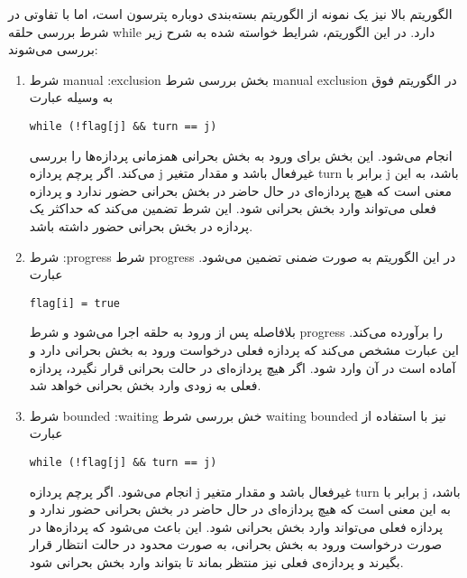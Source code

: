 \begin{qsolve}
	الگوریتم بالا نیز یک نمونه از الگوریتم بسته‌بندی دوباره پترسون است، اما با تفاوتی در شرط بررسی حلقه while دارد. در این الگوریتم، شرایط خواسته شده به شرح زیر بررسی می‌شوند:
	
	\begin{enumerate}
		\item شرط manual :exclusion
بخش بررسی شرط manual exclusion در الگوریتم فوق به وسیله عبارت
\begin{latin}
	\texttt{while (!flag[j] \&\& turn == j)}  
\end{latin}
 انجام می‌شود. این بخش برای ورود به بخش بحرانی همزمانی پردازه‌ها را بررسی می‌کند. اگر پرچم پردازه j غیرفعال باشد و مقدار متغیر turn برابر با j باشد، به این معنی است که هیچ پردازه‌ای در حال حاضر در بخش بحرانی حضور ندارد و پردازه فعلی می‌تواند وارد بخش بحرانی شود. این شرط تضمین می‌کند که حداکثر یک پردازه در بخش بحرانی حضور داشته باشد.
		
		
		\item شرط :progress
شرط progress در این الگوریتم به صورت ضمنی تضمین می‌شود. عبارت
\begin{latin}
	\texttt{flag[i] = true} 
\end{latin}
  بلافاصله پس از ورود به حلقه اجرا می‌شود و شرط progress را برآورده می‌کند. این عبارت مشخص می‌کند که پردازه فعلی درخواست ورود به بخش بحرانی دارد و آماده است در آن وارد شود. اگر هیچ پردازه‌ای در حالت بحرانی قرار نگیرد، پردازه فعلی به زودی وارد بخش بحرانی خواهد شد.
		
		\item شرط bounded :waiting
خش بررسی شرط waiting bounded نیز با استفاده از عبارت
\begin{latin}
	\texttt{while (!flag[j] \&\& turn == j)}
\end{latin}
انجام می‌شود. اگر پرچم پردازه j غیرفعال باشد و مقدار متغیر turn برابر با j باشد، به این معنی است که هیچ پردازه‌ای در حال حاضر در بخش بحرانی حضور ندارد و پردازه فعلی می‌تواند وارد بخش بحرانی شود. این باعث می‌شود که پردازه‌ها در صورت درخواست ورود به بخش بحرانی، به صورت محدود در حالت انتظار قرار بگیرند و پردازه‌ی فعلی نیز منتظر بماند تا بتواند وارد بخش بحرانی شود.
		
	\end{enumerate}
\end{qsolve}








